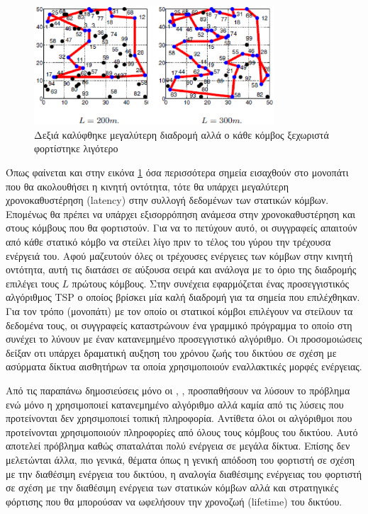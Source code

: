 \begin{figure}[h]
	\centering
	\includegraphics[width=0.8\textwidth]{images/yuanyuan_recharg_paths.eps}
	\caption{Δεξιά καλύφθηκε μεγαλύτερη διαδρομή αλλά ο κάθε κόμβος ξεχωριστά φορτίστηκε λιγότερο}
	\label{fig:yuanyuan_recharg_paths}
\end{figure}
Όπως φαίνεται και στην εικόνα \ref{fig:yuanyuan_recharg_paths} όσα περισσότερα σημεία εισαχθούν στο μονοπάτι που θα ακολουθήσει η κινητή οντότητα, τότε θα
υπάρχει μεγαλύτερη χρονοκαθυστέρηση (latency) στην συλλογή δεδομένων των στατικών κόμβων. Επομένως θα πρέπει να υπάρχει εξισορρόπηση ανάμεσα στην χρονοκαθυστέρηση και
στους κόμβους που θα φορτιστούν. Για να το πετύχουν αυτό, οι συγγραφείς απαιτούν από κάθε στατικό κόμβο να στείλει λίγο πριν το τέλος του γύρου την τρέχουσα ενέργειά
του. Αφού μαζευτούν όλες οι τρέχουσες ενέργειες των κόμβων στην κινητή οντότητα, αυτή τις διατάσει σε αύξουσα σειρά και ανάλογα με το όριο της διαδρομής επιλέγει τους
$L$ πρώτους κόμβους. Στην συνέχεια εφαρμόζεται ένας προσεγγιστικός αλγόριθμος TSP ο οποίος βρίσκει μία καλή διαδρομή για τα σημεία που επιλέχθηκαν. Για τον τρόπο
(μονοπάτι) με τον οποίο οι στατικοί κόμβοι επιλέγουν να στείλουν τα δεδομένα τους, οι συγγραφείς καταστρώνουν ένα γραμμικό πρόγραμμα το οποίο στη συνέχει το λύνουν
με έναν κατανεμημένο προσεγγιστικό αλγόριθμο. Οι προσομοιώσεις δείξαν οτι υπάρχει δραματική αυξηση του χρόνου ζωής του δικτύου σε σχέση με ασύρματα δίκτυα αισθητήρων
τα οποία χρησιμοποιούν εναλλακτικές μορφές ενέργειας.


Από τις παραπάνω δημοσιεύσεις μόνο οι \cite{prolonging_j-roc}, \cite{j-roc}, \cite{yuanyuan_joint} \cite{immortal_wsns} προσπαθήσουν να
λύσουν το πρόβλημα ενώ μόνο η \cite{yuanyuan_joint} χρησιμοποιεί κατανεμημένο αλγόριθμο αλλά  καμία από τις λύσεις που προτείνονται δεν χρησιμοποιεί τοπική
πληροφορία. Αντίθετα όλοι οι αλγόριθμοι που προτείνονται χρησιμοποιούν πληροφορίες από όλους τους κόμβους του δικτύου. Αυτό αποτελεί πρόβλημα καθώς σπαταλάται πολύ
ενέργεια σε μεγάλα δίκτυα. Επίσης δεν μελετώνται άλλα, πιο γενικά, θέματα όπως η γενική απόδοση του φορτιστή σε σχέση με την διαθέσιμη ενέργεια του δικτύου, η
αναλογία διαθέσιμης ενέργειας του φορτιστή σε σχέση με την διαθέσιμη ενέργεια των στατικών κόμβων αλλά και στρατηγικές φόρτισης που θα μπορούσαν να ωφελήσουν την
χρονοζωή (lifetime) του δικτύου.

